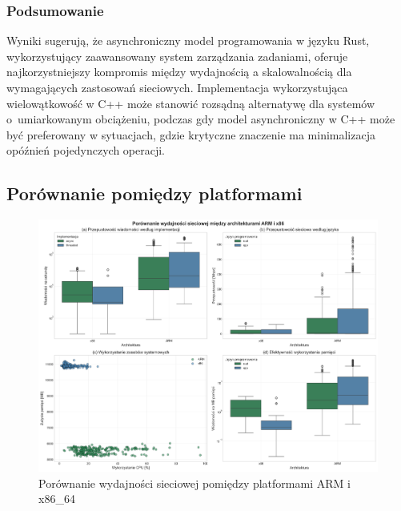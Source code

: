 \subsubsection{Podsumowanie}
Wyniki sugerują, że asynchroniczny model programowania w języku Rust, wykorzystujący zaawansowany system zarządzania zadaniami, oferuje najkorzystniejszy kompromis między wydajnością a skalowalnością dla wymagających zastosowań sieciowych. Implementacja wykorzystująca wielowątkowość w C++ może stanowić rozsądną alternatywę dla systemów o~umiarkowanym obciążeniu, podczas gdy model asynchroniczny w C++ może być preferowany w sytuacjach, gdzie krytyczne znaczenie ma minimalizacja opóźnień pojedynczych operacji.

\subsection{Porównanie pomiędzy platformami}
\begin{figure}[H]
    \centering
    \includegraphics[width=\textwidth]{analiza/images/conc/echo/compare/rysunek_1_wydajnosc_sieciowa.png}
    \caption{Porównanie wydajności sieciowej pomiędzy platformami ARM i x86\_64}
    \label{rysunek_1_wydajnosc_sieciowa}
\end{figure}
